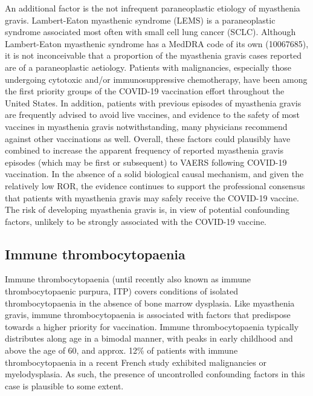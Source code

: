 \documentclass{article}
\begin{document}
An additional factor is the not infrequent paraneoplastic etiology of myasthenia gravis.
Lambert-Eaton myasthenic syndrome (LEMS) is a paraneoplastic syndrome associated most often with small cell lung cancer (SCLC).\cite{o1988lambert}
Although Lambert-Eaton myasthenic syndrome has a MedDRA code of its own (10067685), it is not inconceivable that a proportion of the myasthenia gravis cases reported are of a paraneoplastic aetiology.
Patients with malignancies, especially those undergoing cytotoxic and/or immunosuppressive chemotherapy, have been among the first priority groups of the COVID-19 vaccination effort throughout the United States.
In addition, patients with previous episodes of myasthenia gravis are frequently advised to avoid live vaccines,\cite{gilhus2018myasthenia} and evidence to the safety of most vaccines in myasthenia gravis notwithstanding, many physicians recommend against other vaccinations as well.\cite{zinman2009safety}
Overall, these factors could plausibly have combined to increase the apparent frequency of reported myasthenia gravis episodes (which may be first or subsequent) to VAERS following COVID-19 vaccination.
In the absence of a solid biological causal mechanism, and given the relatively low ROR, the evidence continues to support the professional consensus that patients with myasthenia gravis may safely receive the COVID-19 vaccine.\cite{vzivkovic2021doctor}
The risk of developing myasthenia gravis is, in view of potential confounding factors, unlikely to be strongly associated with the COVID-19 vaccine.


\subsection{Immune thrombocytopaenia}\label{subsec:immune-thrombocytopaenia}

Immune thrombocytopaenia (until recently also known as immune thrombocytopaenic purpura, ITP) covers conditions of isolated thrombocytopaenia in the absence of bone marrow dysplasia.\cite{kistangari2013immune}
Like myasthenia gravis, immune thrombocytopaenia is associated with factors that predispose towards a higher priority for vaccination.
Immune thrombocytopaenia typically distributes along age in a bimodal manner, with peaks in early childhood and above the age of 60, and approx. 12\% of patients with immune thrombocytopaenia in a recent French study exhibited malignancies or myelodysplasia.\cite{moulis2014epidemiology}
As such, the presence of uncontrolled confounding factors in this case is plausible to some extent.
\end{document}
